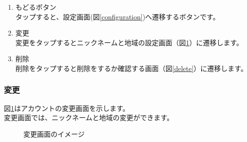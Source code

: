 \documentclass[a4j]{jarticle}
\begin{document}
\begin{enumerate}
  \renewcommand{\labelenumi}{\textcircled{\scriptsize \theenumi}}
\item もどるボタン\\
  タップすると、設定画面(図\ref{configuration})へ遷移するボタンです。
\item 変更\\
  変更をタップするとニックネームと地域の設定画面（図\ref{change}）に遷移します。
\item 削除\\
  削除をタップすると削除をするか確認する画面（図\ref{delete}）に遷移します。
\end{enumerate}

\newpage
\subsubsection{変更}
図\ref{change}はアカウントの変更画面を示します。\\
変更画面では、ニックネームと地域の変更ができます。

\begin{figure}[H]
  \begin{center}
    \caption {変更画面のイメージ}
    \label{change}
  \end{center}
\end{figure}
\end{document}
